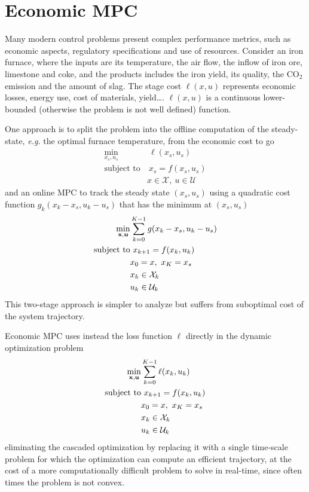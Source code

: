 \chapter{Economic MPC}
\label{chap:economic-mpc}

Many modern control problems present complex performance metrics, such as economic aspects, regulatory specifications and use of resources. Consider an iron furnace, where the inputs are its temperature, the air flow, the inflow of iron ore, limestone and coke, and the products includes the iron yield, its quality, the CO$_2$ emission and the amount of slag. The stage cost $\ell(x,u)$ represents economic losses, energy use, cost of materials, yield\ldots. $\ell(x,u)$ is a continuous lower-bounded (otherwise the problem is not well defined) function.

One approach is to split the problem into the offline computation of the steady-state, \textit{e.g.} the optimal furnace temperature, from the economic cost to go
\begin{align*}
  \min_{x_s,u_s} &\ \ell(x_s,u_s) \\
  \text{subject to} &\ x_s = f(x_s,u_s) \\
                 & x\in \mathcal{X},\ u\in \mathcal{U}
\end{align*}
and an online MPC to track the steady state $(x_s,u_s)$ using a quadratic cost function $g_k(x_k-x_s,u_k-u_s)$ that has the minimum at $(x_s,u_s)$
\begin{align*}
  \min_{\boldsymbol{\mathrm{x}},\boldsymbol{\mathrm{u}}} & \sum_{k=0}^{K-1} g(x_k-x_s,u_k-u_s) \\
  \text{subject to} &\ x_{k+1} = f(x_k,u_k) \\
                   & x_0 = x,\ x_K=x_s \\
                   & x_k\in \mathcal{X}_k\\
                   & u_k\in \mathcal{U}_k
\end{align*}
This two-stage approach is simpler to analyze but suffers from suboptimal cost of the system trajectory.

Economic MPC uses instead the loss function $\ell$ directly in the dynamic optimization problem
\begin{align*}
  \min_{\boldsymbol{\mathrm{x}},\boldsymbol{\mathrm{u}}} & \sum_{k=0}^{K-1} \ell(x_k,u_k) \\
  \text{subject to} &\ x_{k+1} = f(x_k,u_k) \\
                   & x_0 = x,\ x_K=x_s \\
                   & x_k\in \mathcal{X}_k \\
                   & u_k\in \mathcal{U}_k
\end{align*}
eliminating the cascaded optimization by replacing it with a single time-scale problem for which the optimization can compute an efficient trajectory, at the cost of a more computationally difficult problem to solve in real-time, since often times the problem is not convex.

